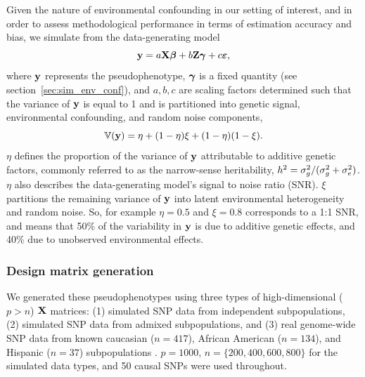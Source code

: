 Given the nature of environmental confounding in our setting of interest, and in order to assess methodological performance in terms of estimation accuracy and bias, we simulate from the data-generating model
\begin{equation}
    \label{eqn:sim}
    \textbf{y} = a \textbf{X} \boldsymbol{\beta}{} + b \textbf{Z} \boldsymbol{\gamma} + c \boldsymbol{\varepsilon}{},
\end{equation}
where $\textbf{y}$ represents the pseudophenotype, $\boldsymbol{\gamma}$ is a fixed quantity (see section~\ref{sec:sim_env_conf}), and $a, b, c$ are scaling factors determined such that the variance of $\textbf{y}$ is equal to 1 and is partitioned into genetic signal, environmental confounding, and random noise components,
\begin{equation}
    \label{eqn:parition_y}
    \mathbb{V}(\textbf{y}) = \eta + (1 - \eta) \xi + (1-\eta)(1-\xi).
\end{equation}
$\eta$ defines the proportion of the variance of $\textbf{y}$ attributable to additive genetic factors, commonly referred to as the narrow-sense heritability, $h^2 = \sigma^2_g/(\sigma^2_g + \sigma^2_e)$. $\eta$ also describes the data-generating model's signal to noise ratio (SNR). $\xi$ partitions the remaining variance of $\textbf{y}$ into latent environmental heterogeneity and random noise. So, for example $\eta = 0.5$ and $\xi = 0.8$ corresponds to a 1:1 SNR, and means that 50\% of the variability in $\textbf{y}$ is due to additive genetic effects, and 40\% due to unobserved environmental effects. 

\subsubsection{Design matrix generation}
We generated these pseudophenotypes using three types of high-dimensional ($p > n$) $\textbf{X}$ matrices: (1) simulated SNP data from independent subpopulations, (2) simulated SNP data from admixed subpopulations, and (3) real genome-wide SNP data from known caucasian ($n = 417$), African American ($n = 134$), and Hispanic ($n = 37$) subpopulations . $p = 1000$, $n = \{200, 400, 600, 800 \}$ for the simulated data types, and 50 causal SNPs were used throughout. 

